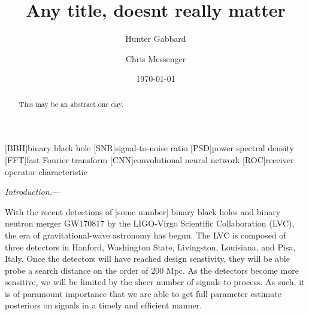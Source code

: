 \documentclass[%
showpacs,
 amsmath,amssymb,
 aps,
 twocolumn,
 prl,
 reprint,
floatfix,
]{revtex4-1}
\newcommand{\dcc}{LIGO-P1700378}
\begin{document}

%
%
\title{Any title, doesnt really matter}

\author{Hunter Gabbard}
\author{Chris Messenger}

\date{\today}%


%
%
\begin{abstract} 
%
This may be an abstract one day.
%
\end{abstract}





\maketitle

[BBH]{binary black hole}
[SNR]{signal-to-noise ratio}
[PSD]{power spectral density}
[FFT]{fast Fourier transform}
[CNN]{convolutional neural network}
[ROC]{receiver operator characteristic}


%
%

%
%
\textit{Introduction.}--- 

%
With the recent detections of [some number] binary black holes \cite{detection papers} and binary neutron merger GW170817 \cite{BNS paper} by the LIGO-Virgo Scientific Collaboration (LVC), the era of gravitational-wave astronomy has begun. The LVC is composed of three detectors in Hanford, Washington State, Livingston, Louisiana, and Pisa, Italy. Once the detectors will have reached design senstivity, they will be able probe a search distance on the order of 200 Mpc. As the detectors become more sensitive, we will be limited by the sheer number of signals to process. As such, it is of paramount importance that we are able to get full parameter estimate posteriors on signals in a timely and efficient manner.
\end{document}
